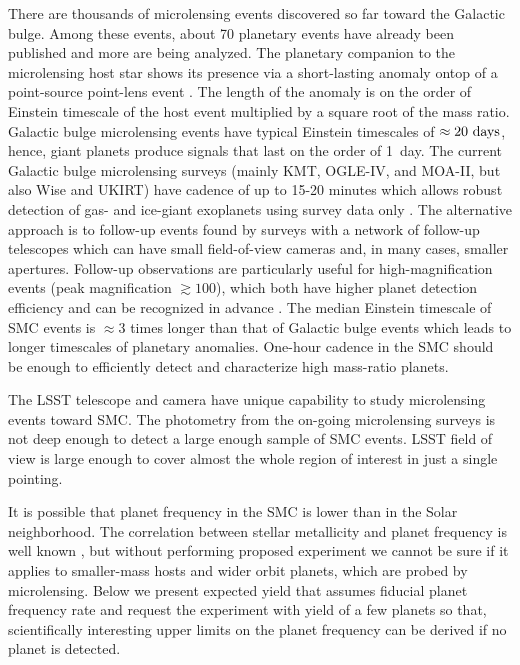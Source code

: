 \documentclass[12pt,letterpaper]{article}
\begin{document}
There are thousands of microlensing events discovered so far toward 
the Galactic bulge.  Among these events, about 70 planetary events have 
already been published and more are being analyzed.  
The planetary companion to the microlensing host star shows its presence via 
a short-lasting anomaly \citep{mao91,gould92} ontop of 
a point-source point-lens event \citep{paczynski86}.  The length of 
the anomaly is on the order of Einstein timescale of the host event 
multiplied by a square root of the mass ratio.  Galactic bulge microlensing 
events have typical Einstein timescales of $\approx20~{\rm days}$, hence, 
giant planets produce signals that last on the order of 1~day.  
The current Galactic bulge microlensing surveys 
(mainly KMT, OGLE-IV, and MOA-II, but also Wise and UKIRT) 
have cadence of up to 15-20 minutes which allows robust detection of gas- and ice-giant 
exoplanets using survey data only \citep[e.g.,][]{yee12,poleski14c,shvartzvald16a}.  
The alternative approach is to follow-up events found by surveys with a network of 
follow-up telescopes which can have small field-of-view cameras and, 
in many cases, smaller apertures.  Follow-up observations are particularly useful for 
high-magnification events (peak magnification $\gtrsim100$), 
which both have higher planet detection efficiency and can be 
recognized in advance \citep{griest98,gould10}.  The median Einstein timescale of 
SMC events is $\approx3$ times longer than that of Galactic bulge events which leads to 
longer timescales of planetary anomalies.  One-hour cadence in the SMC 
should be enough to efficiently detect and characterize high mass-ratio planets.  

The LSST telescope and camera have unique capability 
to study microlensing events toward SMC.  The photometry from the on-going 
microlensing surveys is not deep enough to detect a large enough 
sample of SMC events.  LSST field of view is large enough to cover almost 
the whole region of interest in just a single pointing.

It is possible that planet frequency in the SMC is lower than in 
the Solar neighborhood.  The correlation between stellar metallicity 
and planet frequency is well known \citep{fischervalenti05,wang15}, 
but without performing proposed experiment we cannot be sure if 
it applies to smaller-mass hosts and wider orbit planets, which are probed 
by microlensing.  Below we present expected yield that assumes fiducial 
planet frequency rate and request the experiment with yield of a few planets 
so that, scientifically interesting upper limits on 
the planet frequency can be derived if no planet is detected.
\end{document}
